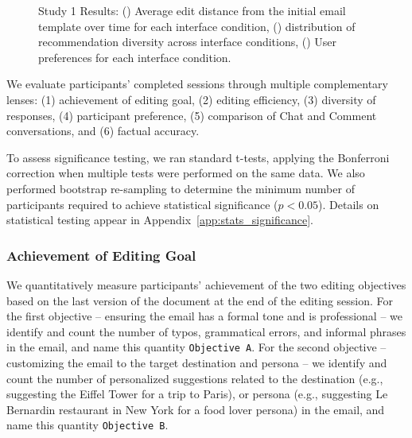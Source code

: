 \documentclass[manuscript]{acmart}
\begin{document}
\begin{figure*}
    \centering
    \begin{minipage}[t]{.27\textwidth}
    \end{minipage}\hfill
    \begin{minipage}[t]{.33\textwidth}
    \end{minipage}\hfill
    \begin{minipage}[t]{0.37\textwidth}
    \end{minipage}\hfill
    \caption{Study 1 Results: () Average edit distance from the initial email template over time for each interface condition, () distribution of recommendation diversity across interface conditions, () User preferences for each interface condition.}
    \label{fig:study1_results}
\end{figure*}

We evaluate participants' completed sessions through multiple complementary lenses: (1) achievement of editing goal, (2) editing efficiency, (3) diversity of responses, (4) participant preference, (5) comparison of Chat and Comment conversations, and (6) factual accuracy.

To assess significance testing, we ran standard t-tests, applying the Bonferroni correction \cite{bonferroni1935calcolo} when multiple tests were performed on the same data. We also performed bootstrap re-sampling \cite{efron1982jackknife} to determine the minimum number of participants required to achieve statistical significance ($p < 0.05$). Details on statistical testing appear in Appendix~\ref{app:stats_significance}.

\subsubsection{Achievement of Editing Goal} \label{sec:study1_evaluation_goal}

We quantitatively measure participants' achievement of the two editing objectives based on the last version of the document at the end of the editing session. For the first objective -- ensuring the email has a formal tone and is professional -- we identify and count the number of typos, grammatical errors, and informal phrases in the email, and name this quantity \texttt{Objective A}. For the second objective -- customizing the email to the target destination and persona -- we identify and count the number of personalized suggestions related to the destination (e.g., suggesting the Eiffel Tower for a trip to Paris), or persona (e.g., suggesting Le Bernardin restaurant in New York for a food lover persona) in the email, and name this quantity \texttt{Objective B}.
\end{document}
